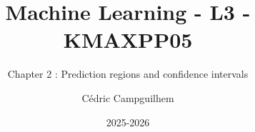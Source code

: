 \documentclass[10pt,handout]{beamer}  %
\title{Machine Learning - L3 - KMAXPP05}
\subtitle{Chapter 2 : Prediction regions and confidence intervals}
\author{Cédric Campguilhem}
\institute[]{
	Airbus Operations \\
	\href{mailto:cedric.campguilhem@airbus.com}{\texttt{cedric.campguilhem@airbus.com}}
}
\date{2025-2026}
\begin{document}
	
\begin{frame}
	\titlepage
\end{frame}
	






\end{document}
